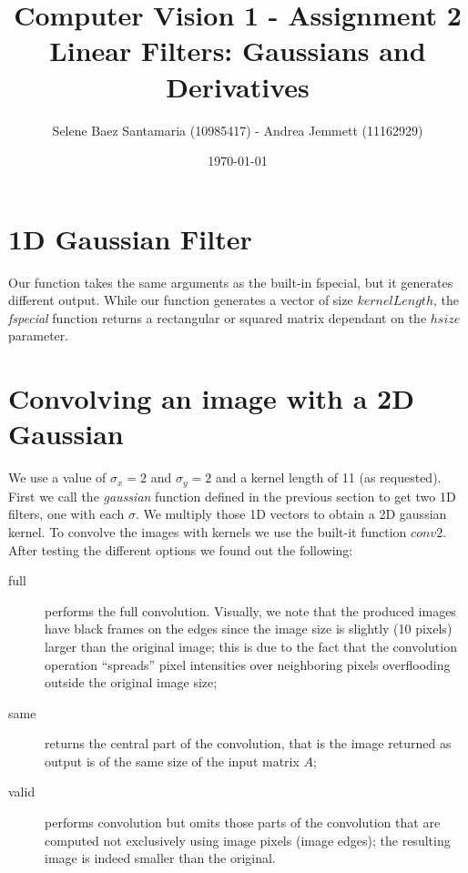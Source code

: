 \documentclass[11pt]{article}
\title{
	{Computer Vision 1 - Assignment 2 \\
	Linear Filters: Gaussians and Derivatives}
}
\author{
Selene Baez Santamaria (10985417) - Andrea Jemmett (11162929)}
\date{\today}
\begin{document}
\maketitle

\section{1D Gaussian Filter}
Our function takes the same arguments as the built-in fspecial, but it generates
different output. While our function generates a vector of size $kernelLength$,
the \emph{fspecial} function returns a rectangular or squared matrix dependant on the
$hsize$ parameter.


\section{Convolving an image with a 2D Gaussian}
We use a value of $\sigma_x = 2$ and $\sigma_y = 2$ and a kernel length of 11
(as requested). First we call the \emph{gaussian} function defined in the
previous section to get two 1D filters, one with each $\sigma$. We multiply
those 1D vectors to obtain a 2D gaussian kernel.
To convolve the images with kernels we use the built-it function $conv2$. After
testing the different options we found out the following:

\begin{description}
	\item[full] performs the full convolution. Visually, we note that the
		produced images have black frames on the edges since the image size
		is slightly (10 pixels) larger than the original image; this is due
		to the fact that the convolution operation ``spreads'' pixel
		intensities over neighboring pixels overflooding outside the
		original image size;
	\item[same] returns the central part of the convolution, that is the image
		returned as output is of the same size of the input matrix $A$;
	\item[valid] performs convolution but omits those parts of the convolution
		that are computed not exclusively using image pixels (image edges);
		the resulting image is indeed smaller than the original.
\end{description}
\end{document}

